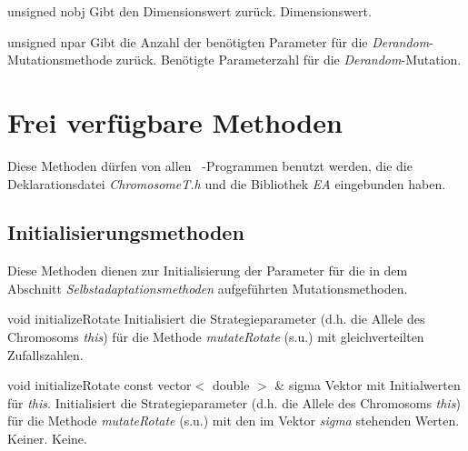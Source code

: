 \documentclass{report}
\begin{document}
\vspace{4ex}

\setNormalInstance
\printEmptyMethodReturn
{unsigned}
{nobj}
{Gibt den Dimensionswert zur\"uck.}
{Dimensionswert.}

\vspace{4ex}

\setNormalInstance
\printEmptyMethodReturn
{unsigned}
{npar}
{Gibt die Anzahl der ben\"otigten Parameter f\"ur die {\em Derandom}-
 Mutationsmethode zur\"uck.}
{Ben\"otigte Parameterzahl f\"ur die {\em Derandom}-Mutation.}


\newpage
\section{Frei verf\"ugbare Methoden}
Diese Methoden d\"urfen von allen \cpp\ -Programmen benutzt werden, die
die Deklarationsdatei {\em ChromosomeT.h} und
die Bibliothek {\em EA} eingebunden haben.

\subsection{Initialisierungsmethoden}

Diese Methoden dienen zur Initialisierung der Parameter f\"ur die in
dem Abschnitt {\em Selbstadaptationsmethoden} aufgef\"uhrten 
Mutationsmethoden.

\vspace{2ex}

\setNormalInstance
\setCorrectWidthThree{8pt}
\printMethodWithParamsSaved
{void}
{}
{initializeRotate}
{Initialisiert die Strategieparameter (d.h. die Allele des
 Chromosoms {\em this}) f\"ur die 
 Methode {\em mutateRotate} (s.u.) mit gleichverteilten Zufallszahlen.}
{}
\setCorrectWidthThree{4pt}

\vspace{4ex}

\setNormalInstance
\printMethodWithOneParam
{void}
{initializeRotate}
{const vector$<$ double $>$ \&}
{sigma}
{Vektor mit Initialwerten f\"ur {\em this}.}
{Initialisiert die Strategieparameter (d.h. die Allele des
 Chromosoms {\em this}) f\"ur die 
 Methode {\em mutateRotate} (s.u.) mit den im Vektor {\em sigma}
 stehenden Werten.}
{Keiner.}
{Keine.}
\end{document}
